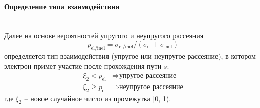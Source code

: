 \paragraph{Определение типа взаимодействия} \mbox{} \\
\indent Далее на основе вероятностей упругого и неупругого рассеяния
\begin{equation} \label{eq:MC_8}
	p_\mathrm{el/inel}=\sigma_\mathrm{el/inel} /\left(\sigma_\mathrm{el}+\sigma_\mathrm{inel} \right)
\end{equation}
определяется тип взаимодействия (упругое или неупругое рассеяние), в котором электрон примет участие после прохождения пути $s$:
\begin{equation} \label{eq:MC_9}
	\begin{split}
		\xi_2 < p_\mathrm{el} & \Rightarrow \text{упругое рассеяние} \\
		\xi_2 \geq p_\mathrm{el} & \Rightarrow \text{неупругое рассеяние}
	\end{split}
\end{equation}
где $\xi_2$ -- новое случайное число из промежутка [0, 1).


